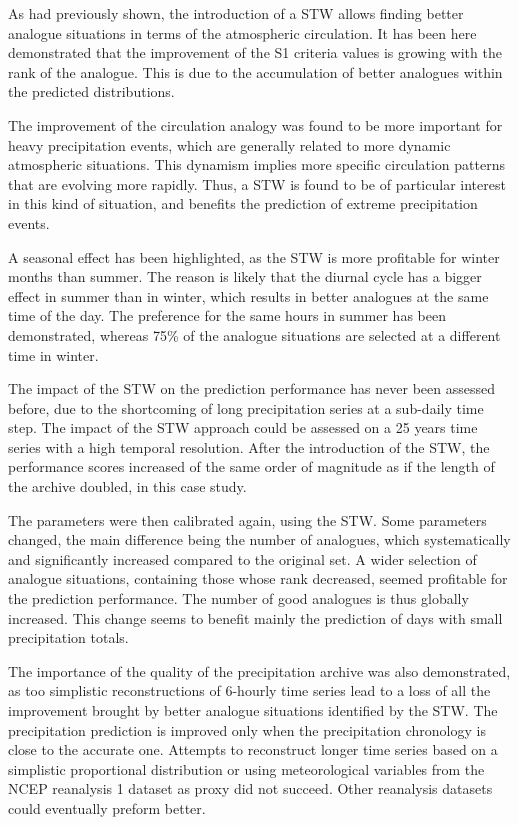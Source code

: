 \documentclass[hess]{copernicus}
\begin{document}
As \citet{Finet2008} had previously shown, the introduction of a STW allows finding better analogue situations in terms of the atmospheric circulation. It has been here demonstrated that the improvement of the S1 criteria values is growing with the rank of the analogue. This is due to the accumulation of better analogues within the predicted distributions.

The improvement of the circulation analogy was found to be more important for heavy precipitation events, which are generally related to more dynamic atmospheric situations. This dynamism implies more specific circulation patterns that are evolving more rapidly. Thus, a STW is found to be of particular interest in this kind of situation, and benefits the prediction of extreme precipitation events.

A seasonal effect has been highlighted, as the STW is more profitable for winter months than summer. The reason is likely that the diurnal cycle has a bigger effect in summer than in winter, which results in better analogues at the same time of the day. The preference for the same hours in summer has been demonstrated, whereas 75\% of the analogue situations are selected at a different time in winter.

The impact of the STW on the prediction performance has never been assessed before, due to the shortcoming of long precipitation series at a sub-daily time step. The impact of the STW approach could be assessed on a 25 years time series with a high temporal resolution. After the introduction of the STW, the performance scores increased of the same order of magnitude as if the length of the archive doubled, in this case study.

The parameters were then calibrated again, using the STW. Some parameters changed, the main difference being the number of analogues, which systematically and significantly increased compared to the original set. A wider selection of analogue situations, containing those whose rank decreased, seemed profitable for the prediction performance. The number of good analogues is thus globally increased. This change seems to benefit mainly the prediction of days with small precipitation totals.

The importance of the quality of the precipitation archive was also demonstrated, as too simplistic reconstructions of 6-hourly time series lead to a loss of all the improvement brought by better analogue situations identified by the STW. The precipitation prediction is improved only when the precipitation chronology is close to the accurate one. Attempts to reconstruct longer time series based on a simplistic proportional distribution or using meteorological variables from the NCEP reanalysis 1 dataset as proxy did not succeed. Other reanalysis datasets could eventually preform better.
\end{document}
